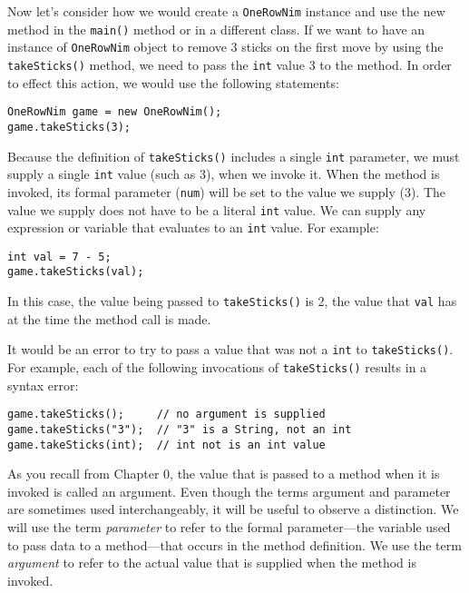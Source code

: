 Now let's consider how we would create a {\tt OneRowNim} instance and
use the new method in the {\tt main()} method or in a different
class. If we want to have an instance of {\tt OneRowNim} object to
remove 3 sticks on the first move by using the {\tt takeSticks()}
method, we need to pass the {\tt int} value 3 to the method. In order
to effect this action, we would use the following statements:

\begin{jjjlisting}
\begin{lstlisting}
OneRowNim game = new OneRowNim();
game.takeSticks(3);
\end{lstlisting}
\end{jjjlisting}

\noindent Because the definition of {\tt takeSticks()} includes a
single {\tt int} parameter, we must supply a single {\tt int} value
(such as 3), when we invoke it.  When the method is invoked, its
formal parameter ({\tt num}) will be set to the value we supply (3).
The value we supply does not have to be a literal {\tt int} value.  We
can supply any expression or variable that evaluates to an {\tt int}
value. For example: 

\begin{jjjlisting}
\begin{lstlisting}
int val = 7 - 5;
game.takeSticks(val);
\end{lstlisting}
\end{jjjlisting}

\noindent In this case, the value being passed to {\tt takeSticks()} is
2, the value that {\tt val} has at the time the method call is made.

It would be an error to try to pass a value that was not a
{\tt int} to {\tt takeSticks()}. For example, each of the following
invocations of {\tt takeSticks()} results in a syntax error:

\begin{jjjlisting}
\begin{lstlisting}
game.takeSticks();     // no argument is supplied
game.takeSticks("3");  // "3" is a String, not an int
game.takeSticks(int);  // int not is an int value
\end{lstlisting}
\end{jjjlisting}

\noindent As you recall from Chapter 0, the value that is 
passed to a method when it is invoked is called 
an argument. Even though the terms argument and
parameter are sometimes used interchangeably, it will
be useful to observe a distinction.  We will use the term {\it
parameter} to refer to the formal parameter---the variable used to
pass data to a method---that occurs in the method definition.  We use
the term {\it argument} to refer to the actual value that is supplied
when the method is invoked.

